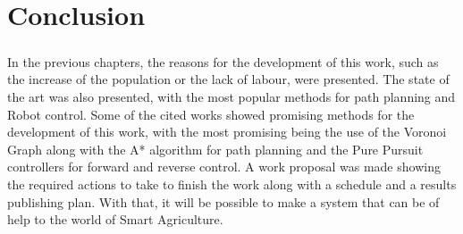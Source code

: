 
%

\chapter{Conclusion}
\label{cha:conclusion}

\paragraph{}In the previous chapters, the reasons for the development of this work, such as 
the increase of the population or the lack of labour, were presented. The state of the art was 
also presented, with the most popular methods for path planning and Robot control. Some 
of the cited works showed promising methods for the development of this work, with the most promising 
being the use of the Voronoi Graph along with the A* algorithm for path planning and the Pure Pursuit 
controllers for forward and reverse control. A work proposal was made showing the required actions 
to take to finish the work along with a schedule and a results publishing plan. With that, it will 
be possible to make a system that can be of help to the world of Smart Agriculture.

